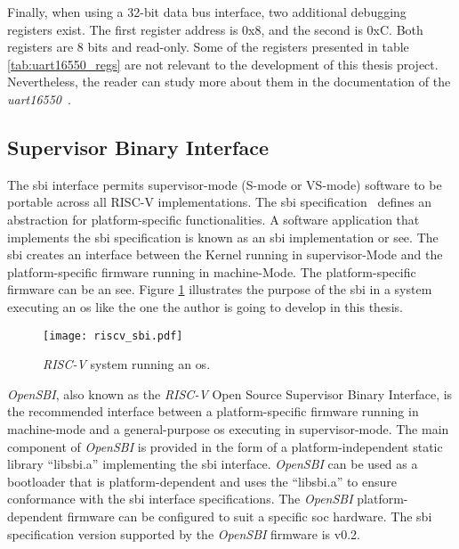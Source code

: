 Finally, when using a 32-bit data bus interface, two additional debugging registers exist. The first register address is 0x8, and the second is 0xC. Both registers are 8 bits and read-only. Some of the registers presented in table \ref{tab:uart16550_regs} are not relevant to the development of this thesis project. Nevertheless, the reader can study more about them in the documentation of the \textit{\acrshort{uart}16550}~\cite{gorban2002uart}.

\subsection{Supervisor Binary Interface}
\label{subsection:sbi}
The \acrfull{sbi} interface permits supervisor-mode (S-mode or VS-mode) software to be portable across all RISC-V implementations. The \acrfull{sbi} specification~\cite{sbi_riscv_spec} defines an abstraction for platform-specific functionalities. A software application that implements the \acrfull{sbi} specification is known as an \acrshort{sbi} implementation or \acrfull{see}. The \acrshort{sbi} creates an interface between the Kernel running in \acrshort{supervisor}-Mode and the platform-specific firmware running in \acrshort{machine}-Mode. The platform-specific firmware can be an \acrlong{see}. Figure \ref{fig:riscv_sbi} illustrates the purpose of the \acrshort{sbi} in a system executing an \acrshort{os} like the one the author is going to develop in this thesis.

\begin{figure}[!ht]
    \centering
    \texttt{[image: riscv\_sbi.pdf]}
    \caption{\textit{RISC-V} system running an \acrlong{os}.}
    \label{fig:riscv_sbi}
\end{figure}

\textit{OpenSBI}, also known as the \textit{RISC-V} Open Source Supervisor Binary Interface, is the recommended interface between a platform-specific firmware running in \acrshort{machine}-mode and a general-purpose \acrshort{os} executing in \acrshort{supervisor}-mode. The main component of \textit{OpenSBI} is provided in the form of a platform-independent static library \enquote{libsbi.a} implementing the \acrshort{sbi} interface. \textit{OpenSBI} can be used as a bootloader that is platform-dependent and uses the \enquote{libsbi.a} to ensure conformance with the \acrshort{sbi} interface specifications. The \textit{OpenSBI} platform-dependent firmware can be configured to suit a specific \acrlong{soc} hardware. The \acrshort{sbi} specification version supported by the \textit{OpenSBI} firmware is v0.2.

